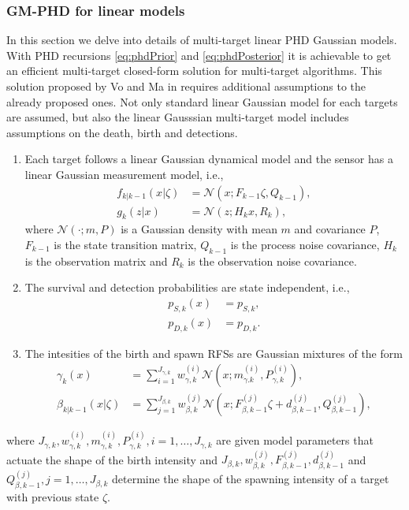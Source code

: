         \subsubsection{GM-PHD for linear models}
\label{sec:gmphdFilter}
In this section we delve into details of multi-target linear PHD Gaussian models. With PHD recursions \eqref{eq:phdPrior} and \eqref{eq:phdPosterior} it is achievable to get an efficient multi-target closed-form solution for multi-target algorithms. This solution proposed by Vo and Ma in \cite{VoMaPHD2006} requires additional assumptions to the already proposed ones. Not only standard linear Gaussian model for each targets are assumed, but also the linear Gausssian multi-target model includes assumptions on the death, birth and detections.
\begin{enumerate}[start=4]
    \item  Each target follows a linear Gaussian dynamical model and the sensor has a linear Gaussian measurement model, i.e., \label{as:phd_4}
        \begin{align}
            f_{k|k-1}(x|\zeta) &= \mathcal{N}(x; F_{k-1}\zeta, Q_{k-1}), \label{eq:phd_linear_model_state}\\
            g_k(z|x) &= \mathcal{N}(z;H_kx, R_k), \label{eq:phd_linear_model_measurements}
        \end{align}
        where $\mathcal{N}(\cdot;m,P)$ is a Gaussian density with mean $m$ and covariance $P$, $F_{k-1}$ is the state transition matrix, $Q_{k-1}$ is the process noise covariance, $H_k$ is the observation matrix and $R_k$ is the observation noise covariance.
    \item The survival and detection probabilities are state independent, i.e., \label{as:phd_5}
        \begin{align}
            p_{S,k}(x) &= p_{S,k}, \label{eq:phd_ps}\\
            p_{D,k}(x) &= p_{D,k}. \label{eq:phd_pd}
        \end{align}
    \item The intesities of the birth and spawn RFSs are Gaussian mixtures of the form \label{as:phd_6}
        \begin{align}
            \gamma_k(x) &= \sum_{i=1}^{J_{\gamma,k}}w_{\gamma,k}^{(i)} \mathcal{N}(x; m_{\gamma.k}^{(i)}, P_{\gamma,k}^{(i)}), \label{eq:phd_birth_intensity} \\
            \beta_{k|k-1}(x|\zeta) &= \sum_{j=1}^{J_{\beta,k}} w_{\beta,k}^{(j)} \mathcal{N}(x;F_{\beta,k-1}^{(j)}\zeta + d_{\beta,k-1}^{(j)}, Q_{\beta,k-1}^{(j)}), \label{eq:phd_spawning_intensity}
        \end{align}
\end{enumerate}
where $J_{\gamma,k}, w_{\gamma,k}^{(i)}, m_{\gamma,k}^{(i)}, P_{\gamma,k}^{(i)}, i=1,\dots, J_{\gamma,k}$ are given model parameters that actuate the shape of the birth intensity and $J_{\beta,k}, w_{\beta,k}^{(j)}, F_{\beta,k-1}^{(j)}, d_{\beta,k-1}^{(j)}$ and $Q_{\beta,k-1}^{(j)}, j=1,\dots, J_{\beta,k}$ determine the shape of the spawning intensity of a target with previous state $\zeta$.

